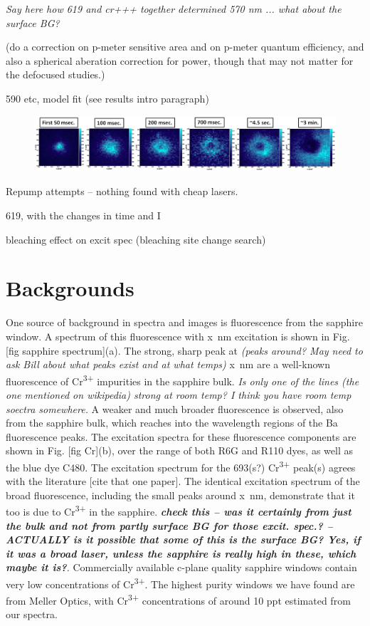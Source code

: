 \emph{\color{gray}Say here how 619 and cr+++ together determined 570 nm ... what about the surface BG?}

({\color{red}do a correction on p-meter sensitive area and on p-meter quantum efficiency, and also a spherical aberation correction for power, though that may not matter for the defocused studies.})

590 etc, model fit (see results intro paragraph)

\begin{figure} %
        \centering
                \includegraphics[width=.9\textwidth]{figures/hole_bleach_590.png}
                \caption{}
\label{fig:testfig}
\end{figure}

Repump attempts -- nothing found with cheap lasers.

619, with the changes in time and I

bleaching effect on excit spec (bleaching site change search)

\section{Backgrounds}
\label{sec:bgs}

One source of background in spectra and images is fluorescence from the sapphire window.  A spectrum of this fluorescence with x~nm excitation is shown in Fig. [fig sapphire spectrum](a).  The strong, sharp peak at \emph{\color{gray}(peaks around? May need to ask Bill about what peaks exist and at what temps)} x~nm are a well-known fluorescence of Cr\textsuperscript{3+} impurities in the sapphire bulk.  \emph{\color{gray}Is only one of the lines (the one mentioned on wikipedia) strong at room temp?  I think you have room temp soectra somewhere.}  A weaker and much broader fluorescence is observed, also from the sapphire bulk, which reaches into the wavelength regions of the Ba fluorescence peaks.  The excitation spectra for these fluorescence components are shown in Fig. [fig Cr](b), over the range of both R6G and R110 dyes, as well as the blue dye C480.  The excitation spectrum for the {\color{red}693(s?)} Cr\textsuperscript{3+} peak{\color{red}(s)} agrees with the literature [cite that one paper].  The identical excitation spectrum of the broad fluorescence, including the small peaks around x~nm, demonstrate that it too is due to Cr\textsuperscript{3+} in the sapphire.  \emph{\color{gray}\textbf{check this -- was it certainly from just the bulk and not from partly surface BG for those excit. spec.? -- ACTUALLY is it possible that some of this is the surface BG?  Yes, if it was a broad laser, unless the sapphire is really high in these, which maybe it is?}.}  Commercially available c-plane quality sapphire windows contain very low concentrations of Cr\textsuperscript{3+}.  The highest purity windows we have found are from Meller Optics, with Cr\textsuperscript{3+} concentrations of around {\color{red}10 ppt} estimated from our spectra.

